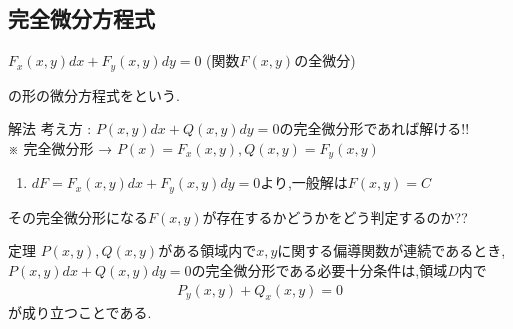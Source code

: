 \documentclass[a4paper]{jsarticle}
\begin{document}
\subsection{完全微分方程式}
\begin{center}
    $F_x\left(x,y\right)dx+F_y\left(x,y\right)dy=0$ (関数$F\left(x,y\right)$の全微分)
\end{center}
の形の微分方程式をという.
\begin{itembox}[l]{解法}
    考え方 : $P\left(x,y\right)dx+Q\left(x,y\right)dy=0$の完全微分形であれば解ける!!\\
    ※ 完全微分形 → $P\left(x\right)=F_x\left(x,y\right),Q\left(x,y\right)=F_y\left(x,y\right)$
    \begin{enumerate}[(1)]
        \item  $dF=F_x\left(x,y\right)dx+F_y\left(x,y\right)dy=0$より,一般解は$F\left(x,y\right)=C$
    \end{enumerate}
\end{itembox}
その完全微分形になる$F\left(x,y\right)$が存在するかどうかをどう判定するのか??
\begin{itembox}[l]{定理}
    $P\left(x,y\right),Q\left(x,y\right)$がある領域内で$x,y$に関する偏導関数が連続であるとき,\\
    $P\left(x,y\right)dx+Q\left(x,y\right)dy=0$の完全微分形である必要十分条件は,領域$D$内で
    \begin{eqnarray*}
        P_y\left(x,y\right)+Q_x\left(x,y\right)=0
    \end{eqnarray*}
    が成り立つことである.
\end{itembox}
\end{document}

